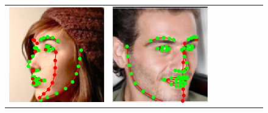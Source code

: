 \begin{figure}[t!]
\begin{center}
\small
\setlength{\tabcolsep}{3pt}
\begin{tabular}{ @{\hskip 1.5mm}c@{\hskip 1.5mm}c@{\hskip 1.5mm}c@{\hskip 1.5mm}c@{}c@{}c@{}c@{\hskip 1.5mm}c@{}}
\includegraphics[width=\AlignFigWid]{img/results/AFLW2000/_pred_AFLW2000_landmarkoverlay_1086.png} &
\includegraphics[width=\AlignFigWid]{img/results/AFLW2000/_pred_AFLW2000_landmarkoverlay_452.png} &

\end{tabular}
\end{center}
\end{figure}
